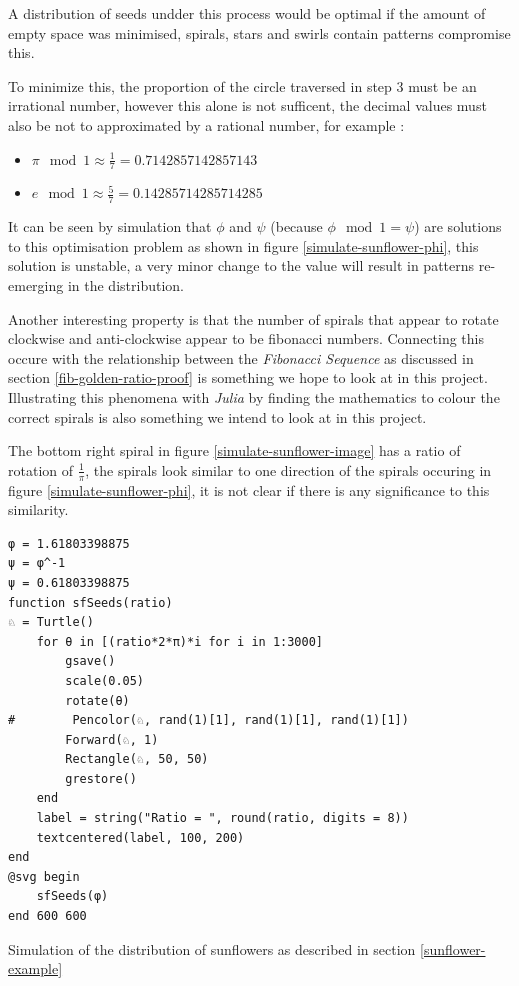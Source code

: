 \documentclass[a4paper,11pt,twoside]{article}
\begin{document}
A distribution of seeds undder this process would be optimal if the amount of empty space was minimised, spirals, stars and swirls contain patterns compromise this.

To minimize this, the proportion of the circle traversed in step 3 must be an
irrational number, however this alone is not sufficent, the decimal values must
also be not to approximated by a rational number, for example
\cite{NatureGoldenRatio2018}:

\begin{itemize}
\item \(\pi \mod 1 \approx \frac{1}{7}=0.7142857142857143\)
\item \(e \mod 1 \approx \frac{5}{7}= 0.14285714285714285\)
\end{itemize}

It can be seen by simulation that \(\phi\) and \(\psi\) (because \(\phi \mod 1 =
\psi\)) are solutions to this optimisation problem as shown in figure
\ref{simulate-sunflower-phi}, this solution is unstable, a very minor change to the
value will result in patterns re-emerging in the distribution.

Another interesting property is that the number of spirals that appear to rotate
clockwise and anti-clockwise appear to be fibonacci numbers. Connecting this
occure with the relationship between the \emph{Fibonacci Sequence} as discussed in
section \ref{fib-golden-ratio-proof} is something we hope to look at in this project.
Illustrating this phenomena with \emph{Julia} by finding the mathematics to colour
the correct spirals is also something we intend to look at in this project.

The bottom right spiral in figure \ref{simulate-sunflower-image} has a ratio of rotation of \(\frac{1}{\pi}\), the spirals look similar to one direction of the spirals occuring in figure \ref{simulate-sunflower-phi}, it is not clear if there is any significance to this similarity.

\begin{listing}[htbp]
\begin{verbatim}
φ = 1.61803398875
ψ = φ^-1
ψ = 0.61803398875
function sfSeeds(ratio)
♘ = Turtle()
    for θ in [(ratio*2*π)*i for i in 1:3000]
        gsave()
        scale(0.05)
        rotate(θ)
#        Pencolor(♘, rand(1)[1], rand(1)[1], rand(1)[1])
        Forward(♘, 1)
        Rectangle(♘, 50, 50)
        grestore()
    end
    label = string("Ratio = ", round(ratio, digits = 8))
    textcentered(label, 100, 200)
end
@svg begin
    sfSeeds(φ)
end 600 600
\end{verbatim}
\caption{\label{simulate-sunflower}Simulation of the distribution of sunflowers as described in section \ref{sunflower-example}}
\end{listing}
\end{document}
